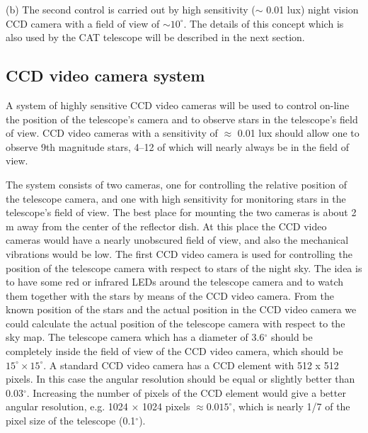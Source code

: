 (b) The second control is carried out by high sensitivity ($\sim $ 0.01 lux)
night vision CCD camera with a field of view of $\sim 10^{\circ }$. The
details of this concept which is also used by the CAT telescope will be
described in the next section.

\subsection{CCD video camera system}


\medskip A system of highly sensitive CCD video cameras will be used to
control on-line the position of the telescope's camera and to observe stars
in the telescope's field of view. CCD video cameras with a sensitivity of $%
\approx $ 0.01 lux should allow one to observe 9th magnitude 
stars, 4--12 of which
will nearly always be in the field of view.

The system consists of two cameras, one for controlling the relative
position of the telescope camera, and one with high sensitivity for
monitoring stars in the telescope's field of view. The best place for
mounting the two cameras is about 2 m away from the
center of the reflector dish. At this place the CCD video cameras would have a
nearly unobscured field of view, and also the mechanical vibrations would be
low. The first CCD video camera is used for controlling the position of the
telescope camera with respect to stars of the night sky. The idea is to have
some red or infrared LEDs around the telescope camera and to watch them
together with the stars by means of the CCD video camera. From the known
position of the stars and the actual position in the CCD video camera we
could calculate the actual position of the telescope camera with respect to
the sky map. The telescope camera which has a diameter of 3.6$^\circ$ should
be completely inside the field of view of the CCD video camera, which should
be $15^\circ \times 15^\circ$. A standard CCD video camera has a CCD element
with 512 x 512 pixels. In this case the angular resolution should be equal
or slightly better than 0.03$^\circ$. Increasing the number of pixels of the
CCD element would give a better angular resolution, e.g. 1024 $\times$ 1024
pixels $\approx 0.015^\circ$, which is nearly 1/7 of the pixel size of the
telescope (0.1$^\circ$).

